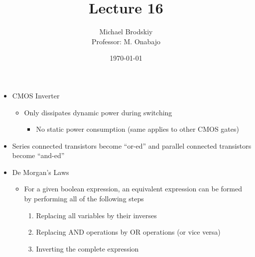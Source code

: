 


\title{Lecture 16}
\date{\today}
\author{Michael Brodskiy\\ \small Professor: M. Onabajo}



\maketitle

\begin{itemize}

  \item CMOS Inverter

    \begin{itemize}

      \item Only dissipates dynamic power during switching

        \begin{itemize}

          \item No static power consumption (same applies to other CMOS gates)

        \end{itemize}

    \end{itemize}

  \item Series connected transistors become ``or-ed'' and parallel connected transistors become ``and-ed''

  \item De Morgan's Laws

    \begin{itemize}

      \item For a given boolean expression, an equivalent expression can be formed by performing all of the following steps

        \begin{enumerate}

          \item Replacing all variables by their inverses

          \item Replacing AND operations by OR operations (or vice versa)

          \item Inverting the complete expression

        \end{enumerate}

    \end{itemize}

\end{itemize}



